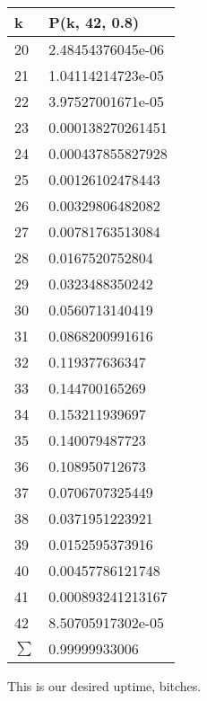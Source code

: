 \documentclass[11pt, oneside]{article}
\begin{document}
\begin{center}
\begin{tabular}{| l | l |}
\hline
k & P(k, 42, 0.8) \\
\hline
20 & 2.48454376045e-06 \\
21 & 1.04114214723e-05 \\
22 & 3.97527001671e-05 \\
23 & 0.000138270261451 \\
24 & 0.000437855827928 \\
25 & 0.00126102478443 \\
26 & 0.00329806482082 \\
27 & 0.00781763513084 \\
28 & 0.0167520752804 \\
29 & 0.0323488350242 \\
30 & 0.0560713140419 \\
31 & 0.0868200991616 \\
32 & 0.119377636347 \\
33 & 0.144700165269 \\
34 & 0.153211939697 \\
35 & 0.140079487723 \\
36 & 0.108950712673 \\
37 & 0.0706707325449 \\
38 & 0.0371951223921 \\
39 & 0.0152595373916 \\
40 & 0.00457786121748 \\
41 & 0.000893241213167 \\
42 & 8.50705917302e-05 \\
\hline
$\sum$ & 0.99999933006 \\
\hline
\end{tabular}
\end{center}
This is our desired uptime, bitches.
\end{document}
